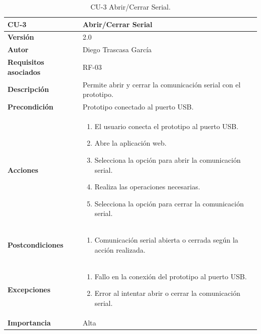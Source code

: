 \begin{table}[p]
	\centering
	\begin{tabularx}{\linewidth}{ p{} p{} }
		\toprule
		\textbf{CU-3}    & \textbf{Abrir/Cerrar Serial}\\
		\toprule
		\textbf{Versión}              & 2.0    \\
		\textbf{Autor}                & Diego Trascasa García \\
		\textbf{Requisitos asociados} & RF-03 \\
		\textbf{Descripción}          & Permite abrir y cerrar la comunicación serial con el prototipo. \\
		\textbf{Precondición}         & Prototipo conectado al puerto USB. \\
		\textbf{Acciones}             &
		\begin{enumerate}
			\item El usuario conecta el prototipo al puerto USB.
			\item Abre la aplicación web.
			\item Selecciona la opción para abrir la comunicación serial.
			\item Realiza las operaciones necesarias.
			\item Selecciona la opción para cerrar la comunicación serial.
		\end{enumerate}\\
		\textbf{Postcondiciones}      & 
		\begin{enumerate}
			\item Comunicación serial abierta o cerrada según la acción realizada.
		\end{enumerate}\\
		\textbf{Excepciones}          & 
		\begin{enumerate}
			\item Fallo en la conexión del prototipo al puerto USB.
			\item Error al intentar abrir o cerrar la comunicación serial.
		\end{enumerate}\\
		\textbf{Importancia}          & Alta \\
		\bottomrule
	\end{tabularx}
	\caption{CU-3 Abrir/Cerrar Serial.}
    \label{CU-3}
\end{table}

